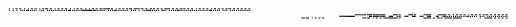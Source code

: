 \documentclass[10pt]{article}
\theoremstyle{plain}
\theoremstyle{definition}
\begin{document}
\begin{table*}[b]
{\begin{minipage}{5.32in}
\[\begin{array}{@{}r@{}}
\begin{array}{@{}l@{}}
\a\a\a\b\a\a\a\b\a\a\b\b\a\a\b\b\a\a\a\b\a\a\a\b\a\a\b\b\a\a\b\b\a\a\a\b \a\a\b\b\a\b\b\b\a\a\b\b\a\a\a\b\a\a\b\b\a\a\b\b\a\a\b\b\a\a\a\b\a\a\a\b \a\a\b\b\a\a\b\b\a\a\a\b\a\a\a\b\a\a\b\b\a\a\b\b\a\a\b\b\b\a\b\b\b\b\b\b \b\a\b\b\a\a\a\b\a\a\b\b\a\a\b\b\a\a\b\b\a\b\b\b\a\a\b\b\b\b\b\b\a\b\b\b \a\a\b\b\a\a\a\b\b\a\b\b\a\a\b\b\a\a\b\b\a\a\b\b\b\b\b\b\a\a\b\b\a\a\b\b \a\a\b\b\b\a\b\b\a\a\b\b\a\a\b\b\a\a\a\b\a\a\b\b\a\a\b\b\a\a\b\b\a\a\a\b \a\a\b\b\a\a\b\b\a\a\b\b\a\a\b\b\a\b\b\b\a\a\b\b\a\a\b\b\a\a\b\b\a\a\b\b \a\a\b\b\mynl
\a\a\a\b\a\a\a\b\a\a\a\b\a\a\a\b\a\b\a\b\a\b\b\b\a\b\a\b\a\b\a\b\a\a\a\b \a\b\a\b\a\a\a\b\a\b\a\b\a\b\a\b\a\b\a\b\a\b\a\b\a\b\a\b\a\b\b\b\a\b\a\b \a\b\a\b\a\b\a\b\b\b\b\b\b\b\b\b\b\b\a\b\b\b\a\b\a\b\a\b\a\b\a\b\a\a\a\b \a\b\a\b\a\b\b\b\a\b\a\b\a\b\a\b\a\b\a\b\a\a\a\b\a\b\a\b\a\a\a\b\a\a\a\b \a\b\a\b\b\b\b\b\a\b\a\b\a\b\a\b\a\a\a\b\b\b\a\b\a\a\a\b\a\b\a\b\a\b\a\b \b\b\a\b\a\b\a\b\a\b\a\b\a\b\a\b\a\b\a\b\a\b\a\b\a\b\a\b\a\b\a\b\a\b\b\b \a\b\a\b\a\b\a\b\a\a\a\b\a\b\a\b\a\a\a\b\a\b\a\b\a\b\a\b\a\b\a\b\a\b\a\b \a\b\a\b
\end{array}
\end{array}
~~~
\begin{array}{@{}r@{}}
\begin{array}{@{}l@{}}
\a\a\a\a\a\a\a\a\a\a\a\a\a\a\a\a\a\a\a\a\a\a\a\a\a\a\a\a\a\a\a\a\a\a\a\a \a\a\a\a\a\a\a\a\a\a\a\a\a\a\a\a\a\a\a\a\a\a\a\a\a\a\a\a\a\a\a\a\a\a\a\a \a\a\a\a\a\a\a\a\a\a\a\a\a\a\a\a\a\a\a\a\a\a\a\a\b\b\b\b\b\b\b\b\b\b\b\b \a\b\b\b\b\b\a\b\b\b\b\b\b\b\b\b\b\b\b\b\a\a\a\a\a\a\a\a\b\b\b\b\b\a\b\b \a\a\a\a\a\a\a\a\b\b\b\b\b\a\b\b\a\a\a\a\a\a\a\a\b\b\b\b\b\b\b\b\a\a\a\a \a\a\a\b\b\b\b\b\b\b\b\b\a\a\b\b\a\a\a\b\a\a\b\b\a\a\b\b\a\a\b\b\a\a\a\b \a\a\b\b\a\a\b\b\a\a\b\b\a\a\b\b\a\b\b\b\a\a\b\b\a\a\b\b\a\a\b\b\a\a\b\b \a\a\b\b\mynl
\a\a\a\a\a\a\a\a\a\a\a\a\a\a\a\a\a\a\a\a\a\a\a\a\a\a\a\a\a\a\a\a\a\a\a\a \a\a\a\a\a\a\a\a\a\a\a\a\a\a\a\a\a\a\a\a\a\a\a\a\a\a\a\a\a\a\a\a\a\a\a\a \a\a\a\a\a\a\a\a\b\b\b\b\b\b\b\b\b\b\b\b\b\b\b\b\a\a\a\a\a\a\a\a\a\a\a\a \a\a\a\b\b\b\a\b\b\b\b\b\b\b\a\b\b\b\b\b\a\a\a\a\b\b\b\b\a\a\a\a\b\a\b\b \a\a\a\a\b\b\b\b\a\a\a\a\b\b\b\b\a\a\a\a\b\b\b\b\a\a\a\a\b\b\b\b\a\a\a\a \a\b\b\b\a\a\a\a\b\b\b\b\a\b\a\b\a\b\a\b\a\b\a\b\a\b\a\b\a\b\a\b\a\b\b\b \a\b\a\b\a\b\a\b\a\a\a\b\a\b\a\b\a\a\a\b\a\b\a\b\a\b\a\b\a\b\a\b\a\b\a\b \a\b\a\b\mynl
\a\a\a\a\a\a\a\a\a\a\a\a\a\a\a\a\a\a\a\a\a\a\a\a\a\a\a\a\a\a\a\a\a\a\a\a \a\a\a\a\b\b\b\b\a\b\b\b\a\a\a\b\a\a\b\b\a\a\b\b\a\a\b\b\a\a\a\a\a\a\a\a \a\a\a\a\a\a\a\a\a\a\a\a\a\a\a\a\a\a\a\a\a\a\a\a\a\a\a\a\a\a\a\a\b\b\b\b \a\b\b\b\a\a\a\b\a\a\b\b\a\a\b\b\a\a\b\b\b\b\b\b\b\b\b\b\b\b\b\b\b\a\b\b \a\a\a\a\a\a\a\a\a\a\a\a\a\a\a\a\a\a\a\a\a\a\a\a\b\b\b\b\b\b\b\b\a\a\b\b \a\a\b\b\b\a\b\b\a\a\b\b\b\b\b\b\b\b\a\b\b\b\b\b\b\b\b\b\a\a\a\a\a\a\a\a \a\a\a\a\a\a\a\a\a\a\a\b\a\a\a\a\b\b\b\b\b\b\b\b\a\a\b\b\a\a\b\b\a\a\b\b \a\a\b\b\mynl

\end{array}
\end{array}\]
\end{minipage}}
\end{table*}
\end{document}
